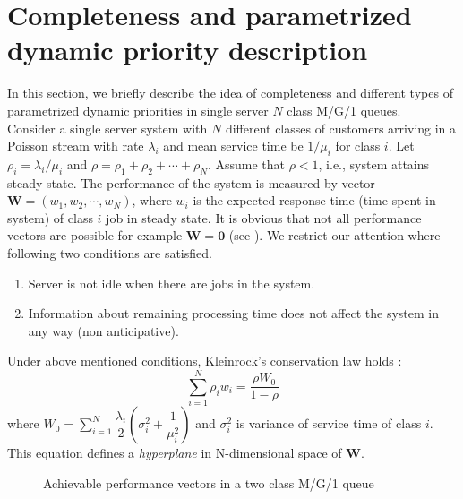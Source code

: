 \documentclass[a4paper,12pt]{article}
\begin{document}
\section{Completeness and parametrized dynamic priority description}
\label{sec:description}
In this section, we briefly describe the idea of completeness and different types of parametrized dynamic priorities in single server $N$ class M/G/1 queues.\\
\indent Consider a single server system with $N$ different classes of customers arriving in a Poisson stream with rate $\lambda_i$ and mean service time be $1/\mu_i$ for class $i$. Let $\rho_i = \lambda_i/\mu_i$ and $\rho = \rho_1 + \rho_2 +\cdots +\rho_N$. Assume that $\rho < 1$, i.e., system attains steady state. The performance of the system is measured by vector $\mathbf{W} = (w_1, w_2, \cdots, w_N)$, where $w_i$ is the expected response time (time spent in system) of class $i$ job in steady state. It is obvious that not all performance vectors are possible for example $\mathbf{W =0}$ (see \cite{complete}). We restrict our attention where following two conditions are satisfied.
\begin{enumerate}
\item Server is not idle when there are jobs in the system. 
\item Information about remaining processing time does not affect the system in any way (non anticipative).
\end{enumerate}
Under above mentioned conditions, Kleinrock's conservation law holds \cite{Kleinrock1965}:
\begin{equation}
\sum_{i=1}^N\rho_i w_i = \dfrac{\rho W_0}{1-\rho}
\end{equation} 
where $W_0 = \sum_{i=1}^N\dfrac{\lambda_i}{2}\left(\sigma_i^2 + \dfrac{1}{\mu_i^2}\right)$ and $\sigma_i^2$ is variance of service time of class $i$. This equation defines a \textit{hyperplane} in N-dimensional space of $\mathbf{W}$. 
\begin{figure}[htb!]
\centering
\resizebox{0.35 \textwidth}{!}{}
\caption{Achievable performance vectors in a two class M/G/1 queue \cite{mitranibook}}
\label{2classline}
\end{figure}
\end{document}
